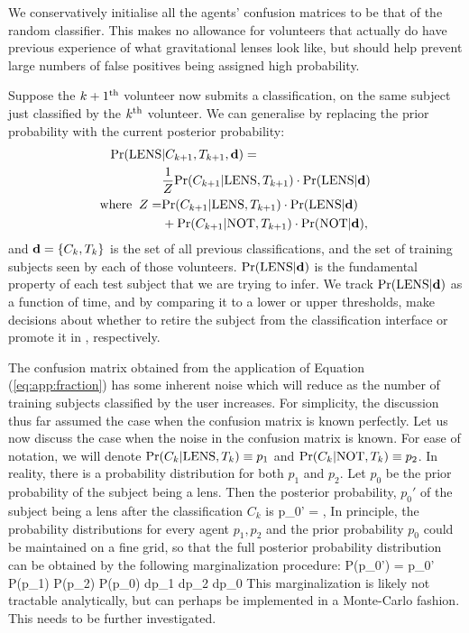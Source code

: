 \documentclass[useAMS,usenatbib,a4paper]{mn2e}
\begin{document}
We conservatively initialise all the agents' confusion matrices to be that of
the random classifier. This makes no allowance for volunteers that actually do
have previous experience of what gravitational lenses look like, but should
help prevent large numbers of false positives being assigned high probability.

Suppose the $k+1^{\rm th}$ volunteer now submits a classification, on the same
subject just classified by the $k^{\rm th}$ volunteer. We can generalise
 by replacing the prior probability with the current
posterior probability:
\begin{align}
  \label{eq:app:update}
  {\rm Pr}({\rm LENS} & |C_{k+1},T_{k+1},{\mathbf{d}}) = \\
  & \frac{1}{Z} {\rm Pr}(C_{k+1}|{\rm LENS},T_{k+1}) \cdot {\rm Pr}({\rm LENS}|{\mathbf{d}}) \\ \notag
{\rm where}\;\; Z = & {\rm Pr}(C_{k+1}|{\rm LENS},T_{k+1})\cdot{\rm Pr}({\rm LENS}|{\mathbf{d}}) \\ \notag
      & + {\rm Pr}(C_{k+1}|{\rm NOT},T_{k+1})\cdot{\rm Pr}({\rm NOT}|{\mathbf{d}}), \notag
\end{align}
and ${\mathbf{d}} = \{C_k,T_k\}$ is the set of all previous
classifications, and the set of training subjects seen by each of those
volunteers.
${\rm Pr}({\rm LENS}|{\mathbf{d}})$ is the fundamental property of each test subject that
we are trying to infer. We track ${\rm Pr}({\rm LENS}|{\mathbf{d}})$ as a function of time,
and by comparing it to a lower or upper thresholds, make decisions about
whether to retire the subject from the classification interface or
promote it in \Talk, respectively.

The confusion matrix obtained from the application of Equation
(\ref{eq:app:fraction}) has some inherent noise which will reduce as the number
of training subjects classified by the user increases. For simplicity, the
discussion thus far assumed the case when the confusion matrix is known
perfectly. Let us now discuss the case when the noise in the confusion matrix
is known. For ease of notation, we will denote ${\rm Pr}(C_k|{\rm LENS},T_k)\equiv p_1$
and ${\rm Pr}(C_k|{\rm NOT},T_k)\equiv p_2$. In reality, there is a probability
distribution for both $p_1$ and $p_2$. Let $p_0$ be the prior probability of
the subject being a lens. Then the posterior probability, $p_0'$ of the subject
being a lens after the classification $C_k$ is
\be
  \label{eq:app:sec}
p_0' = ,
\ee
In principle, the probability distributions for every agent $p_1,p_2$ and the
prior probability $p_0$ could be maintained on a fine grid, so that the full
posterior probability distribution can be obtained by the following
marginalization procedure:
\be
P(p_0') = \int p_0' P(p_1) P(p_2) P(p_0) dp_1 dp_2 dp_0
\ee
This marginalization is likely not tractable analytically, but can perhaps be
implemented in a Monte-Carlo fashion. This needs to be further investigated.
\end{document}
